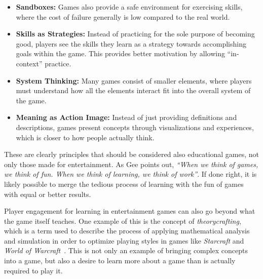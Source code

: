 \begin{itemize}
	\item{\textbf{Sandboxes:}} Games also provide a safe environment for exercising skills, where the cost of failure generally is low compared to the real world.
	\item{\textbf{Skills as Strategies:}} Instead of practicing for the sole purpose of becoming good, players see the skills they learn as a strategy towards accomplishing goals within the game. This provides better motivation by allowing ``in-context'' practice.
	\item{\textbf{System Thinking:}} Many games consist of smaller elements, where players must understand how all the elements interact fit into the overall system of the game.
	\item{\textbf{Meaning as Action Image:}} Instead of just providing definitions and descriptions, games present concepts through visualizations and experiences, which is closer to how people actually think.
\end{itemize}

\noindent
These are clearly principles that should be considered also educational games, not only those made for entertainment. As Gee points out, \emph{``When we think of games, we think of fun. When we think of learning, we think of work''}. If done right, it is likely possible to merge the tedious process of learning with the fun of games with equal or better results.

\noindent
Player engagement for learning in entertainment games can also go beyond what the game itself teaches. One example of this is the concept of \emph{theorycrafting}, which is a term used to describe the process of applying mathematical analysis and simulation in order to optimize playing styles in games like \emph{Starcraft} and \emph{World of Warcraft}~\cite{paul:theorycrafting}. This is not only an example of bringing complex concepts into a game, but also a desire to learn more about a game than is actually required to play it.

